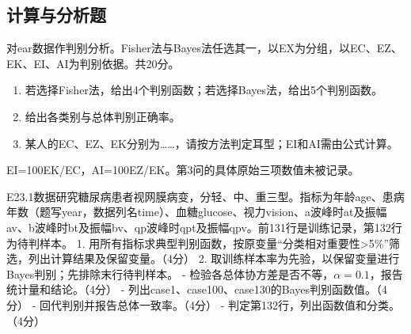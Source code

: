\par\addvspace{6pt}\noindent\begin{minipage}{\linewidth}

\subsection{计算与分析题}


对ear数据作判别分析。Fisher法与Bayes法任选其一，以EX为分组，以EC、EZ、EK、EI、AI为判别依据。共20分。

\begin{enumerate}
\def\labelenumi{\arabic{enumi}.}
\tightlist
\item
  若选择Fisher法，给出4个判别函数；若选择Bayes法，给出5个判别函数。
\item
  给出各类别与总体判别正确率。
\item
  某人的EC、EZ、EK分别为\ldots\ldots，请按方法判定耳型；EI和AI需由公式计算。
\end{enumerate}

EI=100EK/EC，AI=100EZ/EK。第3问的具体原始三项数值未被记录。



\end{minipage}\par\vspace{4pt}

\par\addvspace{6pt}\noindent\begin{minipage}{\linewidth}


E23.1数据研究糖尿病患者视网膜病变，分轻、中、重三型。指标为年龄age、患病年数（题写year，数据列名time）、血糖glucose、视力vision、a波峰时at及振幅av、b波峰时bt及振幅bv、qp波峰时qpt及振幅qpv。前131行是训练记录，第132行为待判样本。 1. 用所有指标求典型判别函数，按原变量``分类相对重要性\textgreater5\%''筛选，列出计算结果及保留变量。（4分） 2. 取训练样本率为先验，以保留变量进行Bayes判别；先排除末行待判样本。 - 检验各总体协方差是否不等，\(\alpha=0.1\)，报告统计量和结论。（4分） - 列出case1、case100、case130的Bayes判别函数值。（4分） - 回代判别并报告总体一致率。（4分） - 判定第132行，列出函数值和分类。（4分）



\end{minipage}\par\vspace{4pt}

